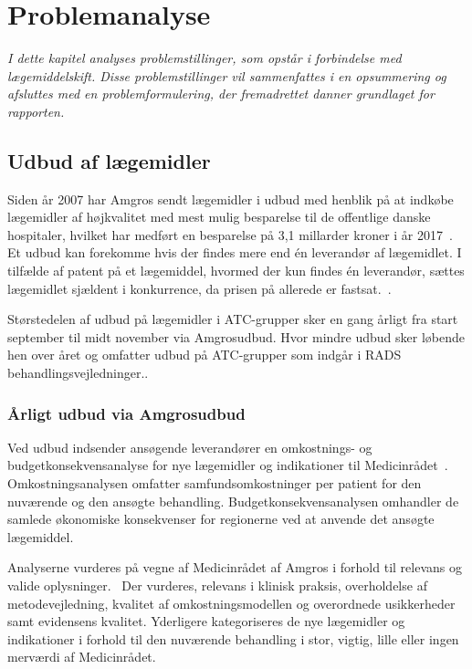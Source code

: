 \chapter{Problemanalyse}
\textit{I dette kapitel analyses problemstillinger, som opstår i forbindelse med lægemiddelskift. Disse problemstillinger vil sammenfattes i en opsummering og afsluttes med en problemformulering, der fremadrettet danner  grundlaget for rapporten.}

\section{Udbud af lægemidler}
Siden år 2007 har Amgros sendt lægemidler i udbud med henblik på at indkøbe lægemidler af højkvalitet med mest mulig besparelse til de offentlige danske hospitaler, hvilket har medført en besparelse på 3,1 millarder kroner i år 2017~\citep{Amgros2017b}. Et udbud kan forekomme hvis der findes mere end én leverandør af lægemidlet. I tilfælde af patent på et lægemiddel, hvormed der kun findes én leverandør, sættes lægemidlet sjældent i konkurrence, da prisen på allerede er fastsat.~\citep{Amgros2015}.

Størstedelen af udbud på lægemidler i ATC-grupper sker en gang årligt fra start september til midt november via Amgrosudbud\citep{Sygehusapoteket2017}. Hvor mindre udbud sker løbende hen over året og omfatter udbud på ATC-grupper som indgår i RADS behandlingsvejledninger.\citep{Sygehusapoteket2017}. 

\subsection{Årligt udbud via Amgrosudbud}
Ved udbud indsender ansøgende leverandører en omkostnings- og budgetkonsekvensanalyse for nye lægemidler og indikationer til Medicinrådet~\citep{Amgros2017, Amgros2017a}. Omkostningsanalysen omfatter samfundsomkostninger per patient for den nuværende og den ansøgte behandling.
Budgetkonsekvensanalysen omhandler de samlede økonomiske konsekvenser for regionerne ved at anvende det ansøgte lægemiddel.~\citep{Amgros2017a}

Analyserne vurderes på vegne af Medicinrådet af Amgros i forhold til relevans og valide oplysninger.~\citep{Amgros2017, Amgros2017a} Der vurderes, relevans i klinisk praksis, overholdelse af metodevejledning, kvalitet af omkostningsmodellen og overordnede usikkerheder samt evidensens kvalitet. Yderligere kategoriseres de nye lægemidler og indikationer i forhold til den nuværende behandling i stor, vigtig, lille eller ingen merværdi af Medicinrådet.~\citep{Amgros2017, Amgros2017a}

